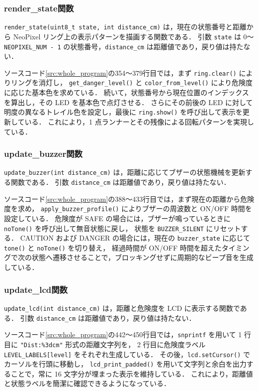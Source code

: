 \documentclass[a4paper,fontsize=11pt,line_length=40zw,number_of_lines=35,baselineskip=1.7zw]{jlreq}
\begin{document}
\subsubsection{render\_state関数}

\lstinline|render_state(uint8_t state, int distance_cm)| は，現在の状態番号と距離から NeoPixel リング上の表示パターンを描画する関数である．
引数 \lstinline|state| は 0〜\lstinline|NEOPIXEL_NUM - 1| の状態番号，\lstinline|distance_cm| は距離値であり，戻り値は持たない．

ソースコード\ref{src:whole_program}の354〜379行目では，まず \lstinline|ring.clear()| によりリングを消灯し，
\lstinline|get_danger_level()| と \lstinline|color_from_level()| により危険度に応じた基本色を求めている．
続いて，状態番号から現在位置のインデックスを算出し，その LED を基本色で点灯させる．
さらにその前後の LED に対して明度の異なるトレイル色を設定し，最後に \lstinline|ring.show()| を呼び出して表示を更新している．
これにより，1 点ランナーとその残像による回転パターンを実現している．

\subsubsection{update\_buzzer関数}

\lstinline|update_buzzer(int distance_cm)| は，距離に応じてブザーの状態機械を更新する関数である．
引数 \lstinline|distance_cm| は距離値であり，戻り値は持たない．

ソースコード\ref{src:whole_program}の388〜433行目では，まず現在の距離から危険度を求め，
\lstinline|apply_buzzer_profile()| によりブザーの周波数と ON/OFF 時間を設定している．
危険度が SAFE の場合には，ブザーが鳴っているときに \lstinline|noTone()| を呼び出して無音状態に戻し，
状態を \lstinline|BUZZER_SILENT| にリセットする．
CAUTION および DANGER の場合には，現在の \lstinline|buzzer_state| に応じて \lstinline|tone()| と \lstinline|noTone()| を切り替え，
経過時間が ON/OFF 時間を超えたタイミングで次の状態へ遷移させることで，ブロッキングせずに周期的なビープ音を生成している．

\subsubsection{update\_lcd関数}

\lstinline|update_lcd(int distance_cm)| は，距離と危険度を LCD に表示する関数である．
引数 \lstinline|distance_cm| は距離値であり，戻り値は持たない．

ソースコード\ref{src:whole_program}の442〜450行目では，\lstinline|snprintf| を用いて 1 行目に \lstinline|"Dist:%3dcm"| 形式の距離文字列を，
2 行目に危険度ラベル \lstinline|LEVEL_LABELS[level]| をそれぞれ生成している．
その後，\lstinline|lcd.setCursor()| でカーソルを行頭に移動し，
\lstinline|lcd_print_padded()| を用いて文字列と余白を出力することで，常に 16 文字分が埋まった表示を維持している．
これにより，距離値と状態ラベルを簡潔に確認できるようになっている．
\end{document}
